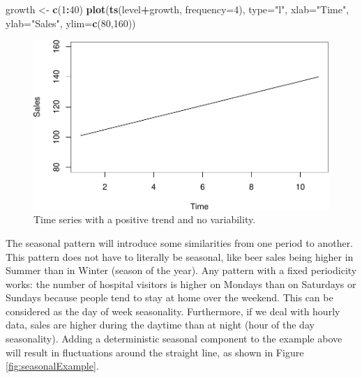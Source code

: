 \documentclass[]{book}
\newenvironment{Shaded}{\begin{snugshade}}{\end{snugshade}}
\newcommand{\DataTypeTok}[1]{\textcolor[rgb]{0.13,0.29,0.53}{#1}}
\newcommand{\DecValTok}[1]{\textcolor[rgb]{0.00,0.00,0.81}{#1}}
\newcommand{\KeywordTok}[1]{\textcolor[rgb]{0.13,0.29,0.53}{\textbf{#1}}}
\newcommand{\NormalTok}[1]{#1}
\newcommand{\OperatorTok}[1]{\textcolor[rgb]{0.81,0.36,0.00}{\textbf{#1}}}
\newcommand{\StringTok}[1]{\textcolor[rgb]{0.31,0.60,0.02}{#1}}
\theoremstyle{definition}
\theoremstyle{definition}
\theoremstyle{definition}
\theoremstyle{definition}
\theoremstyle{remark}
\begin{document}
\begin{Shaded}
\begin{Highlighting}[]
\NormalTok{growth <-}\StringTok{ }\KeywordTok{c}\NormalTok{(}\DecValTok{1}\OperatorTok{:}\DecValTok{40}\NormalTok{)}
\KeywordTok{plot}\NormalTok{(}\KeywordTok{ts}\NormalTok{(level}\OperatorTok{+}\NormalTok{growth, }\DataTypeTok{frequency=}\DecValTok{4}\NormalTok{),}
     \DataTypeTok{type=}\StringTok{"l"}\NormalTok{, }\DataTypeTok{xlab=}\StringTok{"Time"}\NormalTok{, }\DataTypeTok{ylab=}\StringTok{"Sales"}\NormalTok{, }\DataTypeTok{ylim=}\KeywordTok{c}\NormalTok{(}\DecValTok{80}\NormalTok{,}\DecValTok{160}\NormalTok{))}
\end{Highlighting}
\end{Shaded}

\begin{figure}
\centering
\includegraphics{Svetunkov--2022----ADAM_files/figure-latex/trendExample-1.pdf}
\caption{\label{fig:trendExample}Time series with a positive trend and no variability.}
\end{figure}

The seasonal pattern will introduce some similarities from one period to another. This pattern does not have to literally be seasonal, like beer sales being higher in Summer than in Winter (season of the year). Any pattern with a fixed periodicity works: the number of hospital visitors is higher on Mondays than on Saturdays or Sundays because people tend to stay at home over the weekend. This can be considered as the day of week seasonality. Furthermore, if we deal with hourly data, sales are higher during the daytime than at night (hour of the day seasonality). Adding a deterministic seasonal component to the example above will result in fluctuations around the straight line, as shown in Figure \ref{fig:seasonalExample}.
\end{document}
